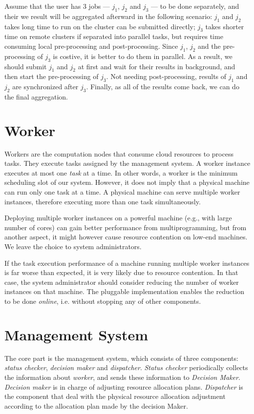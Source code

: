 Assume that the user has 3 jobs --- $j_1$, $j_2$ and $j_3$ --- to be
done separately, and their we result will be aggregated afterward in the
following scenario: $j_1$ and $j_2$ takes long time to run on the
cluster can be submitted directly; $j_3$ takes shorter time on remote
clusters if separated into parallel tasks, but requires time consuming
local pre-processing and post-processing.
Since $j_1$, $j_2$ and the pre-processing of $j_3$ is costive, it is
better to do them in parallel.
As a result, we should submit $j_1$ and $j_2$ at first and wait for
their results in background, and then start the pre-processing of $j_3$.
Not needing post-processing, results of $j_1$ and $j_2$ are synchronized
after $j_3$.
Finally, as all of the results come back, we can do the final
aggregation.

\section{Worker}

Workers are the computation nodes that consume cloud resources to
process tasks.
They execute tasks assigned by the management system.
A worker instance executes at most one \emph{task} at a time.
In other words, a worker is the minimum scheduling slot of our system.
However, it does not imply that a physical machine can run only one task
at a time.
A physical machine can serve multiple worker instances, therefore
executing more than one task simultaneously.

Deploying multiple worker instances on a powerful machine (e.g., with
large number of cores) can gain better performance from
multiprogramming, but from another aspect, it might however cause
resource contention on low-end machines.
We leave the choice to system administrators.

If the task execution performance of a machine running multiple worker
instances is far worse than expected, it is very likely due to resource
contention.
In that case, the system administrator should consider reducing the
number of worker instances on that machine.
The pluggable implementation enables the reduction to be done \emph{
online}, i.e. without stopping any of other components.


\section{Management System}

The core part is the management system, which consists of three
components: \emph{status checker}, \emph{decision maker} and \emph{
dispatcher}.
\emph{Status checker} periodically collects the information about \emph{
worker}, and sends these information to \emph{Decision Maker}.
\emph{Decision maker} is in charge of adjusting resource allocation
plans.
\emph{Dispatcher} is the component that deal with the physical resource
allocation adjustment according to the allocation plan made by the
decision Maker.


